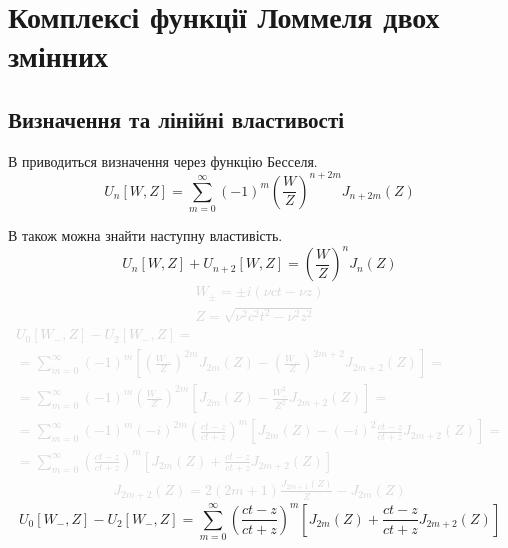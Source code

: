 \chapter{Комплексі функції Ломмеля двох змінних}
\label{ch:lommel}

\section{Визначення та лінійні властивості}

В \cite{Boersma1961} приводиться визначення через функцію Бесселя.
%
\begin{equation}
U_n \left[ W, Z \right] = \sum \limits_{m = 0}^{\infty} (-1)^m
\left( \frac{W}{Z} \right)^{n + 2m} J_{n + 2m} (Z)
\end{equation}

В \cite{Boersma1961} також можна знайти наступну властивість.
%
\begin{equation}
U_n \left[ W, Z \right] + U_{n+2} \left[ W, Z \right] = 
\left( \frac{W}{Z} \right)^n J_n (Z)
\end{equation}
%
\textcolor{lightgray} { \begin{equation*} \begin{aligned}
W_\pm = \pm i (\nu ct - \nu z) \\
Z = \sqrt{\nu^2 c^2t^2 - \nu^2 z^2}
\end{aligned} \end{equation*} }
%
\textcolor{lightgray}{ \begin{equation*} \begin{aligned}
U_0[W_-, Z] - U_2[W_-, Z] = \\ = \sum \limits_{m = 0}^{\infty} (-1)^m
\left[ \left( \frac{W_-}{Z} \right)^{2m} J_{2m} (Z) -
\left( \frac{W_-}{Z} \right)^{2m+2} J_{2m+2} (Z) \right] = \\
= \sum \limits_{m = 0}^{\infty} (-1)^m \left( \frac{W_-}{Z} \right)^{2m}
\left[ J_{2m} (Z) - \frac{W_-^2}{Z^2} J_{2m+2} (Z) \right] = \\
= \sum \limits_{m = 0}^{\infty} (-1)^m (-i)^{2m} 
\left( \frac{ct-z}{ct+z} \right)^m
\left[ J_{2m}(Z) - (-i)^2 \frac{ct-z}{ct+z} J_{2m+2}(Z) \right] = \\
= \sum \limits_{m = 0}^{\infty} \left( \frac{ct-z}{ct+z} \right)^m
\left[ J_{2m}(Z) + \frac{ct-z}{ct+z} J_{2m+2}(Z) \right]
\end{aligned} \end{equation*} }
%
\textcolor{lightgray}{ \begin{equation*} \begin{aligned}
J_{2m+2}(Z) = 2 (2m+1) \frac{J_{2m+1}(Z)}{Z} - J_{2m}(Z)
\end{aligned} \end{equation*} }
%
\begin{equation} 
U_0[W_-, Z] - U_2[W_-, Z] = 
\sum \limits_{m = 0}^{\infty} \left( \frac{ct-z}{ct+z} \right)^m
\left[ J_{2m}(Z) + \frac{ct-z}{ct+z} J_{2m+2}(Z) \right]
\end{equation}

